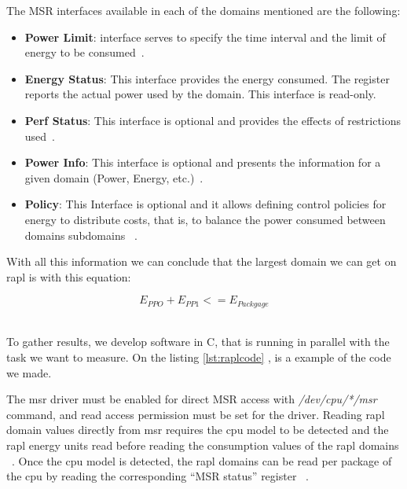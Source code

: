     The MSR interfaces available in each of the domains mentioned are the following:
\begin{itemize}

    \item \textbf{Power Limit}: interface serves to specify the time interval and the limit of energy to be consumed~\cite{raplpref2,portela2016}. 
\item \textbf{Energy Status}: This interface provides the energy consumed. The register reports the actual power used by the domain. This interface is read-only. 
\item\textbf{Perf Status}: This interface is optional and provides the effects of restrictions used~\cite{intel64and,portela2016}.
\item \textbf{Power Info}: This interface is optional and presents the information for a given domain (Power, Energy, etc.)~\cite{portela2016}.
\item \textbf{Policy}: This Interface is optional and it allows defining control policies for energy to distribute costs, that is, to balance the power consumed between domains subdomains ~\cite{raplpref2}. 
\end{itemize}

With all this information we can conclude that the largest domain we can get on \gls{rapl} is with this equation:

\begin{equation}
E_{PPO} + E_{PP1} <= E_{Packgage}
\end{equation}$
$

To gather results, we develop software in C, that is running in parallel with the task we want to measure. On the listing \ref{lst:raplcode} , is a example of the code we made.

    
    

    The \gls{msr} driver must be enabled for direct MSR access with \textit{/dev/cpu/*/msr} command, and read access permission must be set for the driver. Reading \gls{rapl} domain values directly from \gls{msr} requires the \gls{cpu} model to be detected and the \gls{rapl} energy units read before reading the consumption values of the \gls{rapl} domains ~\cite{raplpref,energypapi}. Once the \gls{cpu} model is detected, the \gls{rapl} domains can be read per package of the \gls{cpu} by reading the corresponding “MSR status” register  ~\cite{raplpref,intel64and}.
